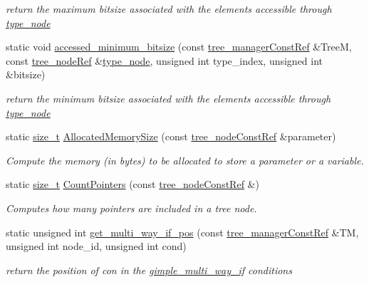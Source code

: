\begin{DoxyCompactItemize}
\begin{DoxyCompactList}\small\item\em return the maximum bitsize associated with the elements accessible through \hyperlink{structtype__node}{type\+\_\+node} \end{DoxyCompactList}\item 
static void \hyperlink{classtree__helper_adc5caf4fcc334a09a633086e5efca1f3}{accessed\+\_\+minimum\+\_\+bitsize} (const \hyperlink{tree__manager_8hpp_a792e3f1f892d7d997a8d8a4a12e39346}{tree\+\_\+manager\+Const\+Ref} \&TreeM, const \hyperlink{tree__node_8hpp_a6ee377554d1c4871ad66a337eaa67fd5}{tree\+\_\+node\+Ref} \&\hyperlink{structtype__node}{type\+\_\+node}, unsigned int type\+\_\+index, unsigned int \&bitsize)
\begin{DoxyCompactList}\small\item\em return the minimum bitsize associated with the elements accessible through \hyperlink{structtype__node}{type\+\_\+node} \end{DoxyCompactList}\item 
static \hyperlink{tutorial__fpt__2017_2intro_2sixth_2test_8c_a7c94ea6f8948649f8d181ae55911eeaf}{size\+\_\+t} \hyperlink{classtree__helper_a55c8ae98513afb49111c0990c05c7764}{Allocated\+Memory\+Size} (const \hyperlink{tree__node_8hpp_a3cf5d02292c940f3892425a5b5fdec3c}{tree\+\_\+node\+Const\+Ref} \&parameter)
\begin{DoxyCompactList}\small\item\em Compute the memory (in bytes) to be allocated to store a parameter or a variable. \end{DoxyCompactList}\item 
static \hyperlink{tutorial__fpt__2017_2intro_2sixth_2test_8c_a7c94ea6f8948649f8d181ae55911eeaf}{size\+\_\+t} \hyperlink{classtree__helper_a414ef9bee92e2a1ffe13ef23594b5229}{Count\+Pointers} (const \hyperlink{tree__node_8hpp_a3cf5d02292c940f3892425a5b5fdec3c}{tree\+\_\+node\+Const\+Ref} \&)
\begin{DoxyCompactList}\small\item\em Computes how many pointers are included in a tree node. \end{DoxyCompactList}\item 
static unsigned int \hyperlink{classtree__helper_afe27e1d8dfb2b64a5def44bafa3fe0eb}{get\+\_\+multi\+\_\+way\+\_\+if\+\_\+pos} (const \hyperlink{tree__manager_8hpp_a792e3f1f892d7d997a8d8a4a12e39346}{tree\+\_\+manager\+Const\+Ref} \&TM, unsigned int node\+\_\+id, unsigned int cond)
\begin{DoxyCompactList}\small\item\em return the position of con in the \hyperlink{structgimple__multi__way__if}{gimple\+\_\+multi\+\_\+way\+\_\+if} conditions \end{DoxyCompactList}\item 

\end{DoxyCompactItemize}
